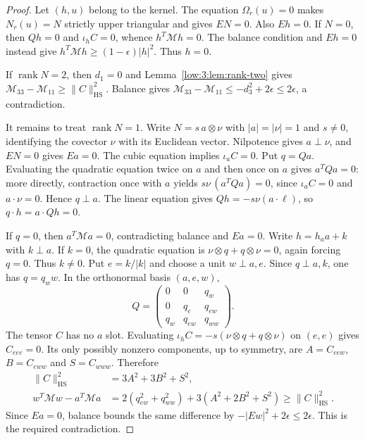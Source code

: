 \documentclass[11pt]{amsart}
\theoremstyle{definition}
\theoremstyle{remark}
\newcommand{\norm}[1]{\lVert #1\rVert}
\newcommand{\abs}[1]{\lvert #1\rvert}
\DeclareMathOperator{\rank}{rank}
\numberwithin{equation}{section}
\begin{document}
\begin{proof}
Let $(h,u)$ belong to the kernel. The equation $\Omega_r(u)=0$ makes $N_r(u)=N$ strictly upper triangular and gives $EN=0$. Also $Eh=0$. If $N=0$, then $Qh=0$ and $\iota_hC=0$, whence $h^T\mathscr M h=0$. The balance condition and $Eh=0$ instead give $h^T\mathscr M h\geq(1-\epsilon)\abs h^2$. Thus $h=0$.

If $\rank N=2$, then $d_1=0$ and Lemma~\ref{low:3:lem:rank-two} gives $\mathscr M_{33}-\mathscr M_{11}\geq\norm C_{\mathrm{HS}}^2$. Balance gives $\mathscr M_{33}-\mathscr M_{11}\leq-d_3^2+2\epsilon\leq2\epsilon$, a contradiction.

It remains to treat $\rank N=1$. Write $N=s\,a\otimes\nu$ with $\abs a=\abs\nu=1$ and $s\ne0$, identifying the covector $\nu$ with its Euclidean vector. Nilpotence gives $a\perp\nu$, and $EN=0$ gives $Ea=0$. The cubic equation implies $\iota_aC=0$. Put $q=Qa$. Evaluating the quadratic equation twice on $a$ and then once on $a$ gives $a^TQa=0$: more directly, contraction once with $a$ yields $s\nu\,(a^TQa)=0$, since $\iota_aC=0$ and $a\cdot\nu=0$. Hence $q\perp a$. The linear equation gives $Qh=-s\nu(a\cdot\ell)$, so $q\cdot h=a\cdot Qh=0$.

If $q=0$, then $a^T\mathscr M a=0$, contradicting balance and $Ea=0$. Write $h=h_a a+k$ with $k\perp a$. If $k=0$, the quadratic equation is $\nu\otimes q+q\otimes\nu=0$, again forcing $q=0$. Thus $k\ne0$. Put $e=k/\abs k$ and choose a unit $w\perp a,e$. Since $q\perp a,k$, one has $q=q_w w$. In the orthonormal basis $(a,e,w)$,
\[
Q=\begin{pmatrix}0&0&q_w\\0&q_e&q_{ew}\\q_w&q_{ew}&q_{ww}\end{pmatrix}.
\]
The tensor $C$ has no $a$ slot. Evaluating $\iota_hC=-s(\nu\otimes q+q\otimes\nu)$ on $(e,e)$ gives $C_{eee}=0$. Its only possibly nonzero components, up to symmetry, are $A=C_{eew}$, $B=C_{eww}$ and $S=C_{www}$. Therefore
\begin{align*}
\norm C_{\mathrm{HS}}^2&=3A^2+3B^2+S^2,\\
w^T\mathscr M w-a^T\mathscr M a&=2(q_{ew}^2+q_{ww}^2)+3(A^2+2B^2+S^2)\geq\norm C_{\mathrm{HS}}^2.
\end{align*}
Since $Ea=0$, balance bounds the same difference by $-\abs{Ew}^2+2\epsilon\leq2\epsilon$. This is the required contradiction.
\end{proof}
\end{document}
